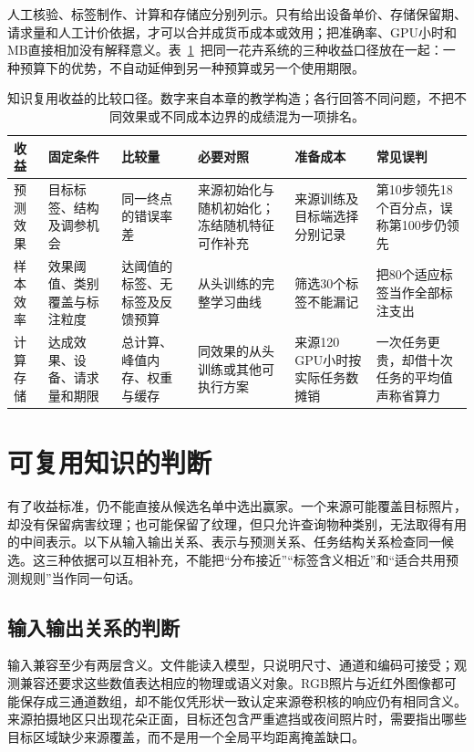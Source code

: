 人工核验、标签制作、计算和存储应分别列示。只有给出设备单价、存储保留期、请求量和人工计价依据，才可以合并成货币成本或效用；把准确率、GPU小时和MB直接相加没有解释意义。表~\ref{tab:ket-reuse-benefit-protocol}~把同一花卉系统的三种收益口径放在一起：一种预算下的优势，不自动延伸到另一种预算或另一个使用期限。

\begin{table}[htbp]
  \centering
  \small
  \begin{tabularx}{\linewidth}{lXXXXX}
    \toprule
    收益 & 固定条件 & 比较量 & 必要对照 & 准备成本 & 常见误判 \\
    \midrule
    预测效果 & 目标标签、结构及调参机会 & 同一终点的错误率差 & 来源初始化与随机初始化；冻结随机特征可作补充 & 来源训练及目标端选择分别记录 & 第10步领先18个百分点，误称第100步仍领先 \\
    样本效率 & 效果阈值、类别覆盖与标注粒度 & 达阈值的标签、无标签及反馈预算 & 从头训练的完整学习曲线 & 筛选30个标签不能漏记 & 把80个适应标签当作全部标注支出 \\
    计算存储 & 达成效果、设备、请求量和期限 & 总计算、峰值内存、权重与缓存 & 同效果的从头训练或其他可执行方案 & 来源120 GPU小时按实际任务数摊销 & 一次任务更贵，却借十次任务的平均值声称省算力 \\
    \bottomrule
  \end{tabularx}
  \caption{知识复用收益的比较口径。数字来自本章的教学构造；各行回答不同问题，不把不同效果或不同成本边界的成绩混为一项排名。}
  \label{tab:ket-reuse-benefit-protocol}
\end{table}

\section{可复用知识的判断}
\label{sec:ket-reuse-compatibility}

有了收益标准，仍不能直接从候选名单中选出赢家。一个来源可能覆盖目标照片，却没有保留病害纹理；也可能保留了纹理，但只允许查询物种类别，无法取得有用的中间表示。以下从输入输出关系、表示与预测关系、任务结构关系检查同一候选。这三种依据可以互相补充，不能把“分布接近”“标签含义相近”和“适合共用预测规则”当作同一句话。

\subsection{输入输出关系的判断}
\label{sec:ket-reuse-input-output}

输入兼容至少有两层含义。文件能读入模型，只说明尺寸、通道和编码可接受；观测兼容还要求这些数值表达相应的物理或语义对象。RGB照片与近红外图像都可能保存成三通道数组，却不能仅凭形状一致认定来源卷积核的响应仍有相同含义。来源拍摄地区只出现花朵正面，目标还包含严重遮挡或夜间照片时，需要指出哪些目标区域缺少来源覆盖，而不是用一个全局平均距离掩盖缺口。

